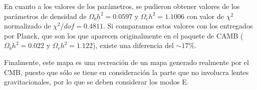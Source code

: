 \documentclass[twocolumn,letterpaper,spanish]{revtex4}
\numberwithin{equation}{section}
\begin{document}
En cuanto a los valores de los par\'ametros, se pudieron obtener valores de los par\'ametros de densidad de $\Omega_b h^2 = 0.0597$ y $\Omega_c h^2 = 1.1006$ con valor de $\chi^2$ normalizado de $\chi^2/dof = 0.4811$. Si comparamos estos valores con los entregados por Planck, que son los que aparecen originalmente en el paquete de CAMB ($\Omega_b h^2 = 0.022$ y $\Omega_c h^2 = 1.122$), existe una diferencia del $\sim 17 \%$.

Finalmente, este mapa es una recreaci\'on de un mapa generado realmente por el CMB, puesto que s\'olo se tiene en consideraci\'on la parte que no involucra lentes gravitacionales, por lo que se deben considerar los modos E.










\end{document}
